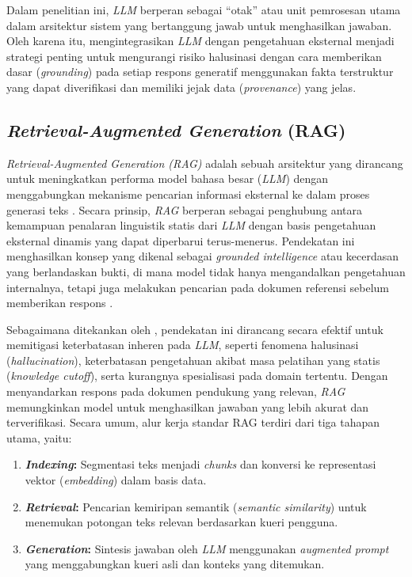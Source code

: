 Dalam penelitian ini, \textit{LLM} berperan sebagai ``otak'' atau unit pemrosesan utama dalam arsitektur sistem yang bertanggung jawab untuk menghasilkan jawaban. Oleh karena itu, mengintegrasikan \textit{LLM} dengan pengetahuan eksternal menjadi strategi penting untuk mengurangi risiko halusinasi dengan cara memberikan dasar (\textit{grounding}) pada setiap respons generatif menggunakan fakta terstruktur yang dapat diverifikasi dan memiliki jejak data (\textit{provenance}) yang jelas.

\subsection{\textit{Retrieval-Augmented Generation} (RAG)}

\textit{Retrieval-Augmented Generation (RAG)} adalah sebuah arsitektur yang dirancang untuk meningkatkan performa model bahasa besar (\textit{LLM}) dengan menggabungkan mekanisme pencarian informasi eksternal ke dalam proses generasi teks \citep{lewis2021retrievalaugmentedgenerationknowledgeintensivenlp}. Secara prinsip, \textit{RAG} berperan sebagai penghubung antara kemampuan penalaran linguistik statis dari \textit{LLM} dengan basis pengetahuan eksternal dinamis yang dapat diperbarui terus-menerus. Pendekatan ini menghasilkan konsep yang dikenal sebagai \textit{grounded intelligence} atau kecerdasan yang berlandaskan bukti, di mana model tidak hanya mengandalkan pengetahuan internalnya, tetapi juga melakukan pencarian pada dokumen referensi sebelum memberikan respons \citep{Huang_2025}.

Sebagaimana ditekankan oleh \citet{Huang_2025}, pendekatan ini dirancang secara efektif untuk memitigasi keterbatasan inheren pada \textit{LLM}, seperti fenomena halusinasi (\textit{hallucination}), keterbatasan pengetahuan akibat masa pelatihan yang statis (\textit{knowledge cutoff}), serta kurangnya spesialisasi pada domain tertentu. Dengan menyandarkan respons pada dokumen pendukung yang relevan, \textit{RAG} memungkinkan model untuk menghasilkan jawaban yang lebih akurat dan terverifikasi. Secara umum, alur kerja standar RAG terdiri dari tiga tahapan utama, yaitu:

\begin{enumerate}[label=\textbf{\Alph*.}, leftmargin=0.75cm]
    \item \textbf{\textit{Indexing}:} Segmentasi teks menjadi \textit{chunks} dan konversi ke representasi vektor (\textit{embedding}) dalam basis data.

    \item \textbf{\textit{Retrieval}:} Pencarian kemiripan semantik (\textit{semantic similarity}) untuk menemukan potongan teks relevan berdasarkan kueri pengguna.

    \item \textbf{\textit{Generation}:} Sintesis jawaban oleh \textit{LLM} menggunakan \textit{augmented prompt} yang menggabungkan kueri asli dan konteks yang ditemukan.
\end{enumerate}

